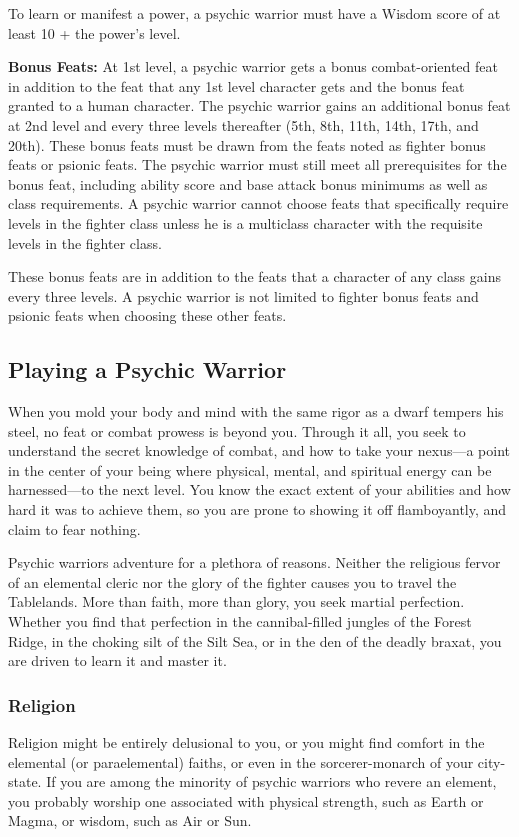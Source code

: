 To learn or manifest a power, a psychic warrior must have a Wisdom score of at least 10 + the power's level.

\textbf{Bonus Feats:} At 1st level, a psychic warrior gets a bonus combat-oriented feat in addition to the feat that any 1st level character gets and the bonus feat granted to a human character. The psychic warrior gains an additional bonus feat at 2nd level and every three levels thereafter (5th, 8th, 11th, 14th, 17th, and 20th). These bonus feats must be drawn from the feats noted as fighter bonus feats or psionic feats. The psychic warrior must still meet all prerequisites for the bonus feat, including ability score and base attack bonus minimums as well as class requirements. A psychic warrior cannot choose feats that specifically require levels in the fighter class unless he is a multiclass character with the requisite levels in the fighter class.

These bonus feats are in addition to the feats that a character of any class gains every three levels. A psychic warrior is not limited to fighter bonus feats and psionic feats when choosing these other feats.

\subsection{Playing a Psychic Warrior}
When you mold your body and mind with the same rigor as a dwarf tempers his steel, no feat or combat prowess is beyond you. Through it all, you seek to understand the secret knowledge of combat, and how to take your nexus---a point in the center of your being where physical, mental, and spiritual energy can be harnessed---to the next level. You know the exact extent of your abilities and how hard it was to achieve them, so you are prone to showing it off flamboyantly, and claim to fear nothing.

Psychic warriors adventure for a plethora of reasons. Neither the religious fervor of an elemental cleric nor the glory of the fighter causes you to travel the Tablelands. More than faith, more than glory, you seek martial perfection. Whether you find that perfection in the cannibal-filled jungles of the Forest Ridge, in the choking silt of the Silt Sea, or in the den of the deadly braxat, you are driven to learn it and master it.

\subsubsection{Religion}
Religion might be entirely delusional to you, or you might find comfort in the elemental (or paraelemental) faiths, or even in the sorcerer-monarch of your city-state. If you are among the minority of psychic warriors who revere an element, you probably worship one associated with physical strength, such as Earth or Magma, or wisdom, such as Air or Sun.


